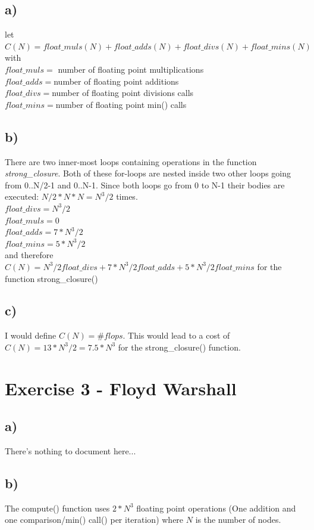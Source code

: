\documentclass[10pt,a4paper,oneside,notitlepage]{report}
\begin{document}
\subsection*{a)}
let $C(N) = float\_muls(N) + float\_adds (N) + float\_divs(N) + float\_mins(N)$ with \\
$float\_muls = $ number of floating point multiplications \\
$float\_adds = $number of floating point additions \\
$float\_divs = $number of floating point divisions calls \\
$float\_mins = $number of floating point min() calls \\

\subsection*{b)}
There are two inner-most loops containing operations in the function \textit{strong\_closure}. Both of these for-loops are nested inside two other loops going from 0..N/2-1 and 0..N-1. Since both loops go from 0 to N-1 their bodies are executed: $N/2 * N * N = N^3/2$ times.
\\
$float\_divs = N^3/2$ \\
$float\_muls = 0$ \\
$float\_adds = 7*N^3/2$ \\
$float\_mins = 5*N^3/2$\\
and therefore $C(N) = N^3/2 float\_divs + 7*N^3/2 float\_adds + 5*N^3/2 float\_mins$ for the function strong\_closure()

\subsection*{c)}
I would define $C(N) = {\#flops}$. This would lead to a cost of $C(N) = 13*N^3/2 = 7.5*N^3$ for the strong\_closure() function.

\section*{Exercise 3 - Floyd Warshall}
\subsection*{a)}
There's nothing to document here...
\subsection*{b)}
The compute() function uses $2*N^3$ floating point operations (One addition and one comparison/min() call() per iteration) where $N$ is the number of nodes.
\end{document}
